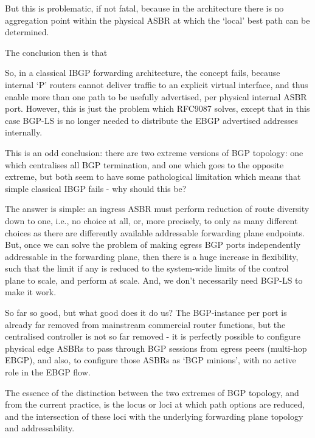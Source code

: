 But this is problematic, if not fatal, because in the architecture there is no aggregation point within the physical ASBR at which the `local' best path can be determined.

The conclusion then is that

So, in a classical IBGP forwarding architecture, the concept fails, because internal `P' routers cannot deliver traffic to an explicit virtual interface, and thus enable more than one path to be usefully advertised, per physical internal ASBR port.  However, this is just the problem which RFC9087 solves, except that in this case BGP-LS is no longer needed to distribute the EBGP advertised addresses internally.
\bigskip

This is an odd conclusion: there are two extreme versions of BGP topology: one which centralises all BGP termination, and one which goes to the opposite extreme, but both seem to have some pathological limitation which means that simple classical IBGP fails - why should this be?

The answer is simple: an ingress ASBR must perform reduction of route diversity down to one, i.e., no choice at all, or, more precisely, to only as many different choices as there are differently available addressable forwarding plane endpoints.  But, once we can solve the problem of making egress BGP ports independently addressable in the forwarding plane, then there is a huge increase in flexibility, such that the limit if any is reduced to the system-wide limits of the control plane to scale, and perform at scale.  And, we don't necessarily need BGP-LS to make it work.

\bigskip

So far so good, but what good does it do us?  The BGP-instance per port is already far removed from mainstream commercial router functions, but the centralised controller is not so far removed - it is perfectly possible to configure physical edge ASBRs to pass through BGP sessions from egress peers (multi-hop EBGP), and also, to configure those ASBRs as `BGP minions', with no active role in the EBGP flow.

\bigskip

The essence of the distinction between the two extremes of BGP topology, and from the current practice, is the locus or loci at which path options are reduced, and the intersection of these loci with the underlying forwarding plane topology and addressability.
\medskip

